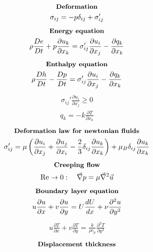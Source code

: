 \documentclass[10pt, a4paper]{article}
\newcommand{\derivative}[2]{\frac{\partial #1}{\partial #2}}
\begin{document}
\begin{multicols*}{2}
\begin{gather*}
    \end{gather*}
    \begin{gather*}
        \textbf{\small Deformation} \\
        \sigma_{ij} = -p \delta_{ij} + \sigma_{ij}'
    \end{gather*}
    \begin{gather*}
        \textbf{\small Energy equation} \\
        \rho \frac{De}{Dt} + p\derivative{ u_k}{x_k} =
        \sigma_{ij}' \derivative{ u_i}{x_j}  - \derivative{ q_k}{x_k}
    \end{gather*}
    \begin{gather*}
        \textbf{\small Enthalpy equation} \\
        \rho \frac{Dh}{Dt} - \frac{Dp}{Dt} =
        \sigma_{ij}' \derivative{ u_i}{x_j}  - \derivative{ q_k}{x_k}
    \end{gather*}
    \begin{gather*}
        \sigma_{ij}' \derivative{ u_i}{x_j} \geq 0
    \end{gather*}
    \begin{gather*}
        q_k = -k\derivative{ T}{x_k}
    \end{gather*}
    \begin{gather*}
        \textbf{\small Deformation law for newtonian fluids} \\
        \sigma_{ij}' = \mu \left( \derivative{ u_i}{x_j} + \derivative{ u_j}{x_i}
        - \frac23\delta_{ij}\derivative{ u_k}{x_k} \right) + \mu_B\delta_{ij}\derivative{ u_k}{x_k}
    \end{gather*}
    \begin{gather*}
        \textbf{\small Creeping flow} \\
        \text{Re} \rightarrow 0: \quad \vec{\nabla}p = \mu \vec{\nabla}^2 \vec{u}
    \end{gather*}
    \begin{gather*}
        \textbf{\small Boundary layer equation} \\
        u\derivative{ u}{x} + v \derivative{ u}{y} =
        U \frac{dU}{dx} + \nu \derivative{^2 u}{y^2}
    \end{gather*}
    \begin{gather*}
        u\derivative{ T}{x} + v \derivative{ T}{y} =
        \frac{k}{\rho c_p} \derivative{^2 T}{y^2}
    \end{gather*}
    \begin{gather*}
        \textbf{\small Displacement thickness} \\

\end{gather*}
\end{multicols*}
\end{document}
